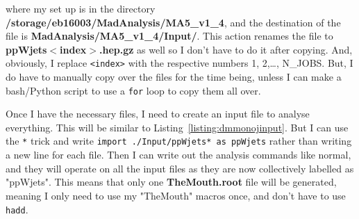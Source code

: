 where my \madanalysis set up is in the directory \textbf{/storage/eb16003/MadAnalysis/MA5\_v1\_4}, and the destination of the file is \textbf{MadAnalysis/MA5\_v1\_4/Input/}. This action renames the file to \textbf{ppWjets$<$index$>$.hep.gz} as well so I don't have to do it after copying. And, obviously, I replace \verb!<index>! with the respective numbers 1, 2,\ldots, N\_JOBS. But, I do have to manually copy over the files for the time being, unless I can make a bash/Python script to use a \verb!for! loop to copy them all over. 


Once I have the necessary files, I need to create an input file to analyse everything. This will be similar to Listing~\ref{listing:dmmonojinput}. But I can use the \verb!*! trick and write \verb!import ./Input/ppWjets* as ppWjets! rather than writing a new line for each file. Then I can write out the analysis commands like normal, and they will operate on all the input files as they are now collectively labelled as "ppWjets". This means that only one \textbf{TheMouth.root} file will be generated, meaning I only need to use my "TheMouth" macros once, and don't have to use \verb!hadd!.

